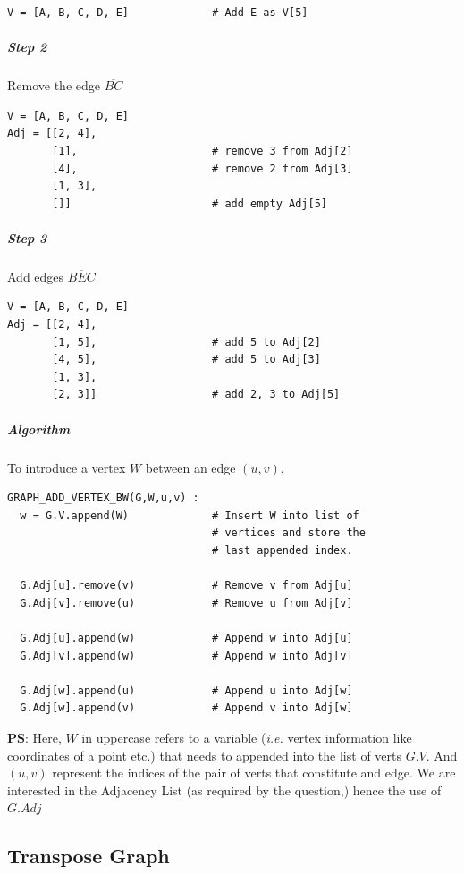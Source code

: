 \documentclass[11pt]{article}
\begin{document}
\begin{verbatim}
V = [A, B, C, D, E]             # Add E as V[5]
\end{verbatim}

\subparagraph*{Step 2}
\label{sec:org04a83b9}
Remove the edge  \(\overline{\mathit{BC}}\)
\begin{verbatim}
V = [A, B, C, D, E]
Adj = [[2, 4],
       [1],                     # remove 3 from Adj[2]
       [4],                     # remove 2 from Adj[3]
       [1, 3],
       []]                      # add empty Adj[5]
\end{verbatim}

\subparagraph*{Step 3}
\label{sec:org48f714d}
Add edges \(\overline{\mathit{BEC}}\)
\begin{verbatim}
V = [A, B, C, D, E]
Adj = [[2, 4],
       [1, 5],                  # add 5 to Adj[2]
       [4, 5],                  # add 5 to Adj[3]
       [1, 3],
       [2, 3]]                  # add 2, 3 to Adj[5]
\end{verbatim}

\subparagraph*{Algorithm}
\label{sec:org40de976}

To introduce a vertex \(W\) between an edge \((u,v)\),

\begin{verbatim}
GRAPH_ADD_VERTEX_BW(G,W,u,v) :
  w = G.V.append(W)             # Insert W into list of
                                # vertices and store the
                                # last appended index.

  G.Adj[u].remove(v)            # Remove v from Adj[u]
  G.Adj[v].remove(u)            # Remove u from Adj[v]

  G.Adj[u].append(w)            # Append w into Adj[u]
  G.Adj[v].append(w)            # Append w into Adj[v]

  G.Adj[w].append(u)            # Append u into Adj[w]
  G.Adj[w].append(v)            # Append v into Adj[w]
\end{verbatim}

\textbf{PS}: Here, \(W\) in uppercase refers to a variable
(\emph{i.e.} vertex information like coordinates of a point
etc.) that needs to appended into the list of verts
\(G.V\). And \((u,v)\) represent the indices of the pair of
verts that constitute and edge.  We are interested in
the Adjacency List (as required by the question,) hence
the use of \(G.Adj\)

\subsection{Transpose Graph}
\label{sec:org99c4fac}
\end{document}
